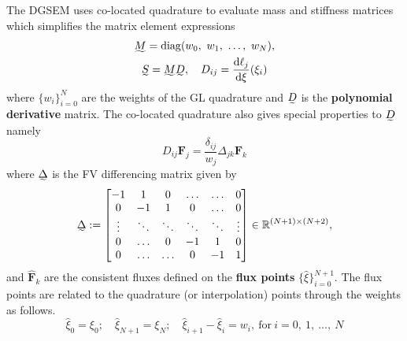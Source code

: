 \documentclass[a4paper,11pt,oneside]{article}
\newcommand{\newword}[1]{\textbf{#1}} %
\newcommand{\vect}[1]{\ensuremath{\boldsymbol{\mathbf{#1}}}} %
\newcommand{\der}[2]{\frac{\sdd #1}{\sdd #2}}
\newcommand{\sdd}{\ensuremath{\text{d}}} %
\DeclareMathOperator{\diag}{diag} %
\newcommand{\defeq}{\ensuremath{:=}} %
\newcommand{\linalgmat}[1]{\ensuremath{\undertilde{#1}}} %
\newcommand{\eulerref}[1]{\ensuremath{#1}} %
\begin{document}
The DGSEM uses co-located quadrature to evaluate mass and stiffness matrices which simplifies the matrix element expressions
\begin{gather}
	\linalgmat{M} = \diag(w_0,\ w_1,\ \ldots,\ w_N),
	\label{eq:dgsem_mass_matrix}\\
	\linalgmat{S} = \linalgmat{M} \linalgmat{D}, \quad D_{ij} = \der{\ell_j}{\xi}(\xi_i)
	\label{eq:dgsem_polynomial_derivative_matrix}
\end{gather}
where $\{w_i\}_{i=0}^{N}$ are the weights of the GL quadrature and $\linalgmat{D}$ is the \newword{polynomial derivative} matrix. The co-located quadrature also gives special properties to $\linalgmat{D}$ namely \cite{fisherCarpenterNordstrom2013}
\begin{equation}
	D_{ij} \vect{\eulerref{F}}_j = \frac{\delta_{ij}}{w_j} \Delta_{jk} \hat{\vect{\eulerref{F}}}_k
	\label{eq:telescopic_form_definition}
\end{equation}
where $\linalgmat{\Delta}$ is the FV differencing matrix given by
\begin{equation}
	\linalgmat{\Delta} \defeq
	\begin{bmatrix}
		-1 & 1 & 0 & \ldots & \ldots & 0\\
		0 & -1 & 1 & 0 & \ldots & 0\\
		\vdots & \ddots & \ddots & \ddots & \ddots & \vdots\\
		0 & \ldots & 0 & -1 & 1 & 0\\
		0 & \ldots & \ldots & 0 & -1 & 1\\
	\end{bmatrix}
	\in \mathbb{R}^{(N+1)\times(N+2)},
	\label{eq:fv_differencing_matrix_definition}
\end{equation}
and $\hat{\vect{\eulerref{F}}}_k$ are the consistent fluxes defined on the \newword{flux points} $\{\hat{\xi}\}_{i=0}^{N+1}$. The flux points are related to the quadrature (or interpolation) points through the weights as follows.
\begin{equation}
	\hat{\xi}_0 = \xi_0; \quad \hat{\xi}_{N+1} = \xi_N;\quad
	\hat{\xi}_{i+1} - \hat{\xi}_i = w_i,\ \text{for}\ i=0,\ 1,\ \ldots,\ N
	\label{eq:flux_points}
\end{equation}

\printbibliography
\end{document}
